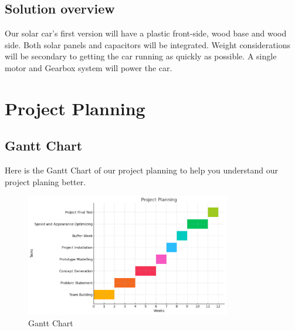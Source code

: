 \documentclass[12pt]{article}
\begin{document}
\subsection{Solution overview}
Our solar car’s first version will have a plastic front-side, wood base and wood side. 
Both solar panels and capacitors will be integrated. 
Weight considerations will be secondary to getting the car running as quickly as possible. 
A single motor and Gearbox system will power the car.

\newpage
\section{Project Planning}

\subsection{Gantt Chart}
Here is the Gantt Chart of our project planning to help you understand our project planing better. 
\begin{figure}[h] 
    \centering 
    \includegraphics[width=0.8\textwidth]{figure/Picture1.png} 
    \caption{Gantt Chart} 
\end{figure}
\end{document}
